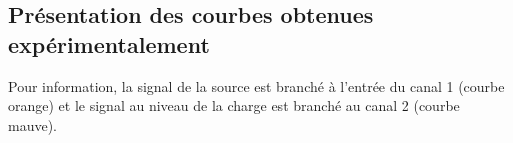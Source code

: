 \subsection{Présentation des courbes obtenues expérimentalement}
Pour information, la signal de la source est branché à l'entrée du canal 1 (courbe orange) et le signal au niveau de la charge est branché au canal 2 (courbe mauve).
\begin{figure}[htb]
	\centering
{}
		\quad
		\quad

\end{figure}
